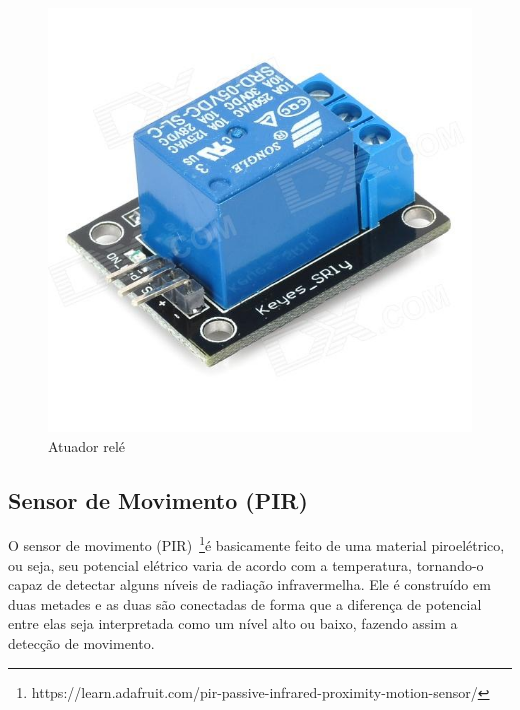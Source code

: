 \begin{figure}[ht]
      \centering
      \includegraphics[scale=0.25]{figuras/Frele.jpg}
      \caption{Atuador relé}
      \label{fig:Arele}
\end{figure}


\subsection{Sensor de Movimento (PIR)}

O sensor de movimento (PIR)~\footnote{https://learn.adafruit.com/pir-passive-infrared-proximity-motion-sensor/}é basicamente feito de uma material piroelétrico, ou seja, seu potencial elétrico varia de acordo com a temperatura, tornando-o capaz de detectar alguns níveis de radiação infravermelha. Ele é construído em duas metades e as duas são conectadas de forma que a diferença de potencial entre elas seja interpretada como um nível alto ou baixo, fazendo assim a detecção de movimento.

